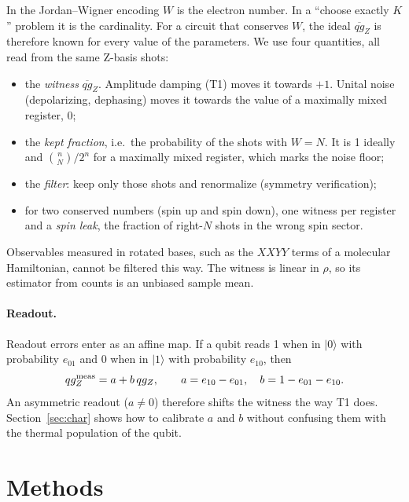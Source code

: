 \documentclass[11pt]{article}
\newcommand{\qgZ}{qg_Z}
\newcommand{\mqg}{\overline{qg}_Z}
\begin{document}
In the Jordan--Wigner encoding $W$ is the electron number. In a ``choose exactly $K$'' problem it
is the cardinality. For a circuit that conserves $W$, the ideal $\mqg$ is therefore known for every
value of the parameters. We use four quantities, all read from the same Z-basis shots:
\begin{itemize}
\item the \emph{witness} $\mqg$. Amplitude damping (T1) moves it towards $+1$. Unital noise
(depolarizing, dephasing) moves it towards the value of a maximally mixed register, 0;
\item the \emph{kept fraction}, i.e.\ the probability of the shots with $W=N$. It is 1 ideally and
$\binom{n}{N}/2^n$ for a maximally mixed register, which marks the noise floor;
\item the \emph{filter}: keep only those shots and renormalize (symmetry verification);
\item for two conserved numbers (spin up and spin down), one witness per register and a
\emph{spin leak}, the fraction of right-$N$ shots in the wrong spin sector.
\end{itemize}
Observables measured in rotated bases, such as the $XXYY$ terms of a molecular Hamiltonian, cannot be
filtered this way. The witness is linear in $\rho$, so its estimator from counts is an unbiased
sample mean.

\paragraph{Readout.} Readout errors enter as an affine map. If a qubit reads 1 when in $|0\rangle$
with probability $e_{01}$ and 0 when in $|1\rangle$ with probability $e_{10}$, then
\begin{equation}\label{eq:affine}
\qgZ^{\rm meas}=a+b\,\qgZ,\qquad a=e_{10}-e_{01},\quad b=1-e_{01}-e_{10}.
\end{equation}
An asymmetric readout ($a\neq0$) therefore shifts the witness the way T1 does. Section~\ref{sec:char}
shows how to calibrate $a$ and $b$ without confusing them with the thermal population of the qubit.

\section{Methods}\label{sec:methods}
\end{document}
